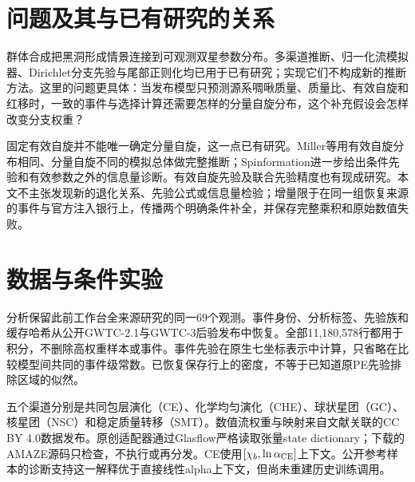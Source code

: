 \begin{abstract}
本文检验公开四维形成渠道模型如何一致接入含有额外自旋坐标的事件后验与搜索注入。我们保留固定的69个GWTC-3时期观测及全部11,180,578行已恢复来源的后验。在明确限制的质量、红移和自旋域内，将五个公开渠道模拟器固定于出生自旋0.1、共同包层效率2，比较两种显式隐藏自旋条件补全、三个正则化概率、两份O3注入银行和两种搜索口径，共24组条件后验。内禀分支中位数沿这四个比较轴的最大移动分别为\MaxHidden、\MaxReg、\MaxBank、\MaxPolicy\ 个百分点；两套独立后验算法的已核查分位数相差不超过\MaxIndependent\ 个百分点。由于共同均匀项的计算效率远高于共同包层模型，1\%的密度正则项可占检出模型混合约12\%。这些结果是固定保存银行上的条件敏感性研究，不是宇宙形成比例测量，也未认证历史检出协议。事件和注入贡献集中的问题仍构成重要未决误差。
\end{abstract}

\section{问题及其与已有研究的关系}
群体合成把黑洞形成情景连接到可观测双星参数分布。多渠道推断、归一化流模拟器、Dirichlet分支先验与尾部正则化均已用于已有研究\cite{zevin,colloms}；实现它们不构成新的推断方法。这里的问题更具体：当发布模型只预测源系啁啾质量、质量比、有效自旋和红移时，一致的事件与选择计算还需要怎样的分量自旋分布，这个补充假设会怎样改变分支权重？

固定有效自旋并不能唯一确定分量自旋，这一点已有研究。Miller等\cite{miller}用有效自旋分布相同、分量自旋不同的模拟总体做完整推断；Spinformation\cite{plunkett}进一步给出条件先验和有效参数之外的信息量诊断。有效自旋先验及联合先验精度也有现成研究\cite{callister,iwaya}。本文不主张发现新的退化关系、先验公式或信息量检验；增量限于在同一组恢复来源的事件与官方注入银行上，传播两个明确条件补全，并保存完整乘积和原始数值失败。

\section{数据与条件实验}
分析保留此前工作台全来源研究的同一69个观测。事件身份、分析标签、先验族和缓存哈希从公开GWTC-2.1与GWTC-3后验发布中恢复。全部11,180,578行都用于积分，不删除高权重样本或事件。事件先验在原生七坐标表示中计算，只省略在比较模型间共同的事件级常数。已恢复保存行上的密度，不等于已知道原PE先验排除区域的似然。

五个渠道分别是共同包层演化（CE）、化学均匀演化（CHE）、球状星团（GC）、核星团（NSC）和稳定质量转移（SMT）。数值流权重与映射来自文献\cite{colloms}关联的CC BY 4.0数据发布。原创适配器通过Glasflow严格读取张量state dictionary；下载的AMAZE源码只检查，不执行或再分发。CE使用$[\chi_b,\ln\alpha_{\rm CE}]$上下文。公开参考样本的诊断支持这一解释优于直接线性alpha上下文，但尚未重建历史训练调用。

